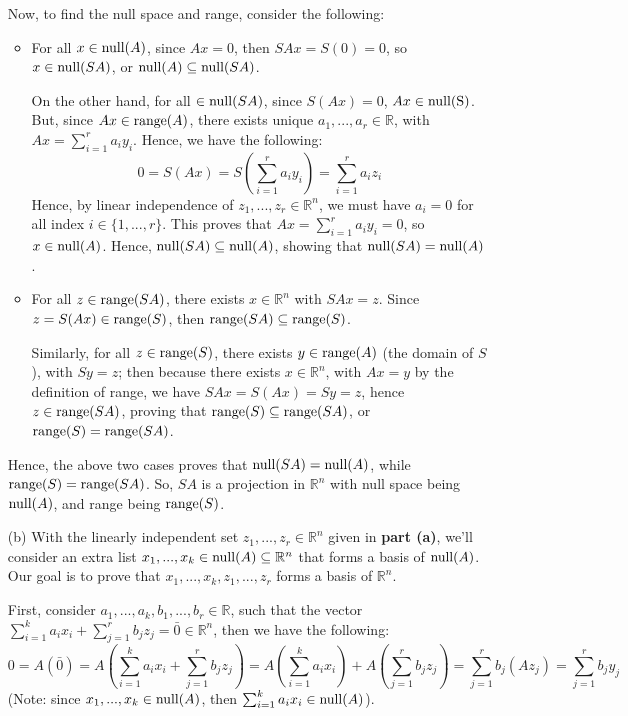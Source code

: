 \documentclass{article}
\begin{document}
\begin{itemize}
    \hfil

    Now, to find the null space and range, consider the following:
    \begin{itemize}
        \item For all $x\in\textmd{null}(A)$, since $Ax = 0$, then $SAx = S(0)=0$, so $x\in \textmd{null}(SA)$, or $\textmd{null}(A)\subseteq \textmd{null}(SA)$.
        
        On the other hand, for all $\in \textmd{null}(SA)$, since $S(Ax)=0$, $Ax \in \textmd{null(S)}$. But, since $Ax\in\textmd{range}(A)$, there exists unique $a_1,...,a_r\in\mathbb{R}$, with $Ax = \sum_{i=1}^{r}a_iy_i$. Hence, we have the following:
        $$ 0 = S(Ax)=S\left(\sum_{i=1}^{r}a_iy_i\right) = \sum_{i=1}^{r}a_iz_i$$
        Hence, by linear independence of $z_1,...,z_r\in\mathbb{R}^n$, we must have $a_i=0$ for all index $i\in\{1,...,r\}$.
        This proves that $Ax = \sum_{i=1}^{r}a_iy_i = 0$, so $x\in\textmd{null}(A)$. Hence, $\textmd{null}(SA)\subseteq \textmd{null}(A)$, showing that $\textmd{null}(SA)= \textmd{null}(A)$.

        \item For all $z\in\textmd{range}(SA)$, there exists $x\in\mathbb{R}^n$ with $SAx = z$. Since $z=S(Ax)\in \textmd{range}(S)$, then $\textmd{range}(SA)\subseteq\textmd{range}(S)$.
        
        Similarly, for all $z\in\textmd{range}(S)$, there exists $y\in \textmd{range}(A)$ (the domain of $S$), with $Sy = z$; then because there exists $x\in\mathbb{R}^n$, with $Ax = y$ by the definition of range, we have $SAx = S(Ax) = Sy = z$, hence $z\in \textmd{range}(SA)$, proving that $\textmd{range}(S)\subseteq \textmd{range}(SA)$, or $\textmd{range}(S)=\textmd{range}(SA)$.
    \end{itemize}
    Hence, the above two cases proves that $\textmd{null}(SA)= \textmd{null}(A)$, while $\textmd{range}(S)=\textmd{range}(SA)$. So, $SA$ is a projection in $\mathbb{R}^n$ with null space being $\textmd{null}(A)$, and range being $\textmd{range}(S)$.

    \hfil

    \item[(b)] With the linearly independent set $z_1,...,z_r\in\mathbb{R}^n$ given in \textbf{part (a)}, we'll consider an extra list $x_1,...,x_k\in \textmd{null}(A)\subseteq\mathbb{R}^n$ that forms a basis of $\textmd{null}(A)$. Our goal is to prove that $x_1,...,x_k,z_1,...,z_r$ forms a basis of $\mathbb{R}^n$.
    
    First, consider $a_1,...,a_k,b_1,...,b_r\in\mathbb{R}$, such that the vector $\sum_{i=1}^{k}a_ix_i+\sum_{j=1}^{r}b_jz_j = \bar{0}\in\mathbb{R}^n$, then we have the following:
    $$0=A(\bar{0})=A\left(\sum_{i=1}^{k}a_ix_i+\sum_{j=1}^{r}b_jz_j\right) = A\left(\sum_{i=1}^{k}a_ix_i\right)+A\left(\sum_{j=1}^{r}b_jz_j\right)=\sum_{j=1}^{r}b_j(Az_j) = \sum_{j=1}^{r}b_jy_j$$
    (Note: since $x_1,...,x_k\in\textmd{null}(A)$, then $\sum_{i=1}^{k}a_ix_i\in\textmd{null}(A)$).


\end{itemize}
\end{document}
